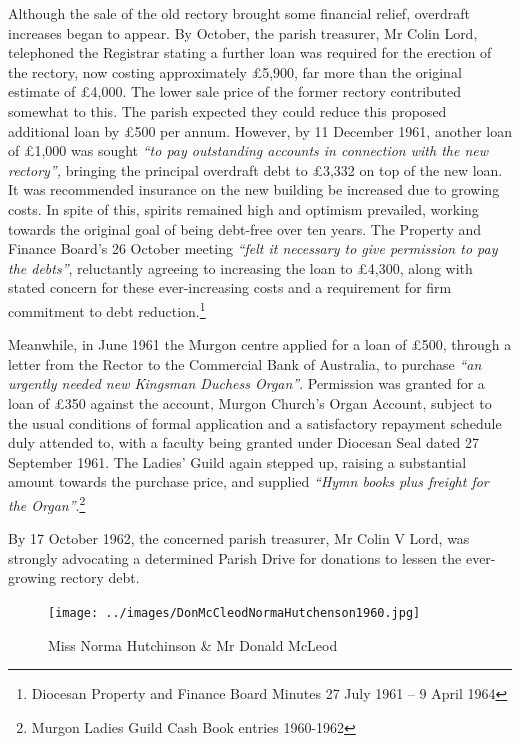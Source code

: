 Although the sale of the old rectory brought some financial relief, overdraft increases began to appear. By October, the parish treasurer, Mr Colin Lord, telephoned the Registrar stating a further loan was required for the erection of the rectory, now costing approximately \pounds5,900, far more than the original estimate of \pounds4,000. The lower sale price of the former rectory contributed somewhat to this. The parish expected they could reduce this proposed additional loan by \pounds500 per annum. However, by 11 December 1961, another loan of \pounds1,000 was sought \emph{``to pay outstanding accounts in connection with the new rectory'',} bringing the principal overdraft debt to \pounds3,332 on top of the new loan. It was recommended insurance on the new building be increased due to growing costs. In spite of this, spirits remained high and optimism prevailed, working towards the original goal of being debt-free over ten years. The Property and Finance Board's 26 October meeting \emph{``felt it necessary to give permission to pay the debts''}, reluctantly agreeing to increasing the loan to \pounds4,300, along with stated concern for these ever-increasing costs and a requirement for firm commitment to debt reduction.\footnote{Diocesan Property and Finance Board Minutes 27 July 1961 -- 9 April 1964}


Meanwhile, in June 1961 the Murgon centre applied for a loan of \pounds500, through a letter from the Rector to the Commercial Bank of Australia, to purchase \emph{``an urgently needed new Kingsman Duchess Organ''}. Permission was granted for a loan of \pounds350 against the account, Murgon Church's Organ Account, subject to the usual conditions of formal application and a satisfactory repayment schedule duly attended to, with a faculty being granted under Diocesan Seal dated 27 September 1961. The Ladies' Guild again stepped up, raising a substantial amount towards the purchase price, and supplied \emph{``Hymn books plus freight for the Organ''}.\footnote{Murgon Ladies Guild Cash Book entries 1960-1962}


By 17 October 1962, the concerned parish treasurer, Mr Colin V Lord, was strongly advocating a determined Parish Drive for donations to lessen the ever-growing rectory debt.









\begin{figure}[!htb]
\begin{center}
\texttt{[image: ../images/DonMcCleodNormaHutchenson1960.jpg]}
\caption{Miss Norma Hutchinson \& Mr Donald McLeod}
\end{center}
\end{figure}




